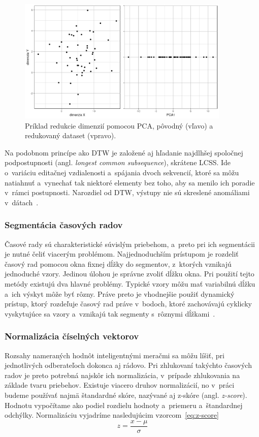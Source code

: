 \documentclass[a4paper,twoside,slovak,12pt,appendix]{article}
\begin{document}
\begin{figure}[htbp]
  \centering
  \includegraphics[width=0.9\textwidth]{pca_example.png}
  \caption{Príklad redukcie dimenzií pomocou PCA, pôvodný (vľavo) a redukovaný dataset (vpravo).}
  \label{fig:pca-example}
\end{figure}

Na podobnom princípe ako DTW je založené aj hľadanie najdlhšej spoločnej
podpostupnosti (angl. \textit{longest common subsequence}), skrátene LCSS. Ide
o~variáciu editačnej vzdialenosti a~spájania dvoch sekvencií, ktoré sa môžu
natiahnuť a~vynechať tak niektoré elementy bez toho, aby sa menilo ich poradie
v~rámci postupnosti. Narozdiel od DTW, výstupy nie sú skreslené anomáliami
v~dátach~\cite{Fu2011}.

\subsubsection{Segmentácia časových radov}
Časové rady sú charakteristické súvislým priebehom, a~preto pri ich segmentácii
je nutné čeliť viacerým problémom. Najjednoduchším prístupom je rozdeliť časový
rad pomocou okna fixnej dĺžky do segmentov, z~ktorých vznikajú jednoduché vzory.
Jedinou úlohou je správne zvoliť dĺžku okna. Pri použití tejto metódy existujú
dva hlavné problémy. Typické vzory môžu mať variabilnú dĺžku a~ich výskyt môže
byť rôzny. Práve preto je vhodnejšie použiť dynamický prístup, ktorý rozdeľuje
časový rad práve v~bodoch, ktoré zachovávajú cyklicky vyskytujúce sa vzory
a~vznikajú tak segmenty s~rôznymi dĺžkami~\cite{Fu2011}.

\subsubsection{Normalizácia číselných vektorov}
\label{c:z-score}
Rozsahy nameraných hodnôt inteligentnými meračmi sa môžu líšiť, pri jednotlivých
odberateľoch dokonca aj rádovo. Pri zhlukovaní takýchto časových radov je preto
potrebná najskôr ich normalizácia, v~prípade zhlukovania na základe tvaru
priebehov. Existuje viacero druhov normalizácií, no v~práci budeme používať
najmä štandardné skóre, nazývané aj z-skóre (angl. \textit{z-score}). Hodnotu
vypočítame ako podiel rozdielu hodnoty a~priemeru a~štandardnej odchýlky.
Normalizáciu vyjadríme nasledujúcim
vzorcom~\ref{eq:z-score}~\cite{Arampatzis2009}
\begin{equation}
	\label{eq:z-score}
  z = \frac{x-\mu}{\sigma}
\end{equation}
\end{document}
